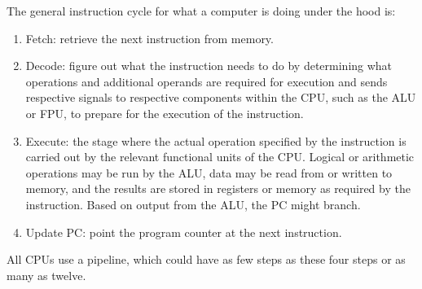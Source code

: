 The general instruction cycle for what a computer is doing under the
hood is:
\begin{enumerate}
    \item Fetch: retrieve the next instruction from memory.
    \item Decode: figure out what the instruction needs to do
          by determining what operations and additional operands
          are required for execution and sends respective signals
          to respective components within the CPU, such as the ALU
          or FPU, to prepare for the execution of the instruction.
    \item Execute: the stage where the actual operation
          specified by the instruction is carried out by the relevant
          functional units of the CPU. Logical or arithmetic operations
          may be run by the ALU, data may be read from or written to
          memory, and the results are stored in registers or memory as
          required by the instruction. Based on output from the ALU,
          the PC might branch.
    \item Update PC: point the program counter at the next instruction.
\end{enumerate}
All CPUs use a pipeline, which could have as few steps as these four
steps or as many as twelve.